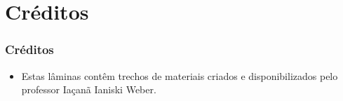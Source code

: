 \documentclass[aspectratio=169]{beamer}
\begin{document}
\section{Créditos}

\begin{frame}\frametitle{Créditos}
\begin{itemize}
	\item Estas lâminas contêm trechos de materiais criados e disponibilizados pelo professor Iaçanã Ianiski Weber.
\end{itemize}
\end{frame}

\end{document}
